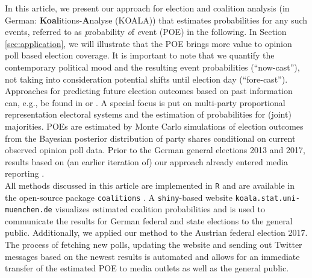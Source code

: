 \documentclass[smallcondensed]{svjour3}     %
\begin{document}
In this article, we present our approach for election and coalition analysis
(in German: \textbf{Koal}itions-\textbf{A}nalyse (KOALA)) that estimates probabilities
for any such events, referred to as \emph{p}robability \emph{o}f \emph{e}vent (POE)
in the following. In Section \ref{sec:application}, we will illustrate that the
POE brings more value to opinion poll based election coverage.
It is important to note that we quantify the contemporary political mood
and the resulting event probabilities (``now-cast''), not taking into consideration
potential shifts until election day (``fore-cast''). Approaches for predicting
future election outcomes based on past information can, e.g., be found in
\citet{graefe_2017} or \citet{norpoth_gschwend_2010}. A special focus is put on
multi-party proportional representation electoral systems and the estimation
of probabilities for (joint) majorities. POEs are estimated by Monte Carlo
simulations of election outcomes from the Bayesian posterior distribution of party
shares conditional on current observed opinion poll data. Prior to the German general
elections 2013 and 2017, results based on (an earlier iteration of) our approach
already entered media reporting \citep[cf.][]{wahlistik_2013, gelitz_2017}.\\

All methods discussed in this article are implemented in \texttt{R} \citep{r_2017}
and are available in the open-source package \texttt{coalitions} \citep{bender_bauer_2018}.
A \texttt{shiny}-based \citep{chang_2017} website
\texttt{koala.stat.uni-\allowbreak muenchen.\allowbreak de} visualizes estimated
coalition probabilities and is used to communicate the results for German federal
and state elections to the general public. Additionally, we applied our method
to the Austrian federal election 2017. The process of fetching new polls,
updating the website and sending out Twitter messages based on the newest results
is automated and allows for an immediate transfer of the estimated POE
to media outlets as well as the general public.
\end{document}
